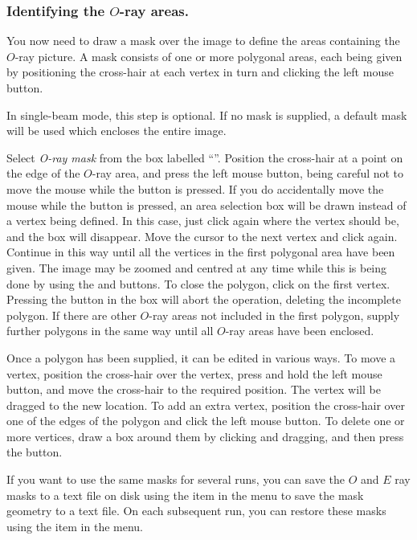 \subsubsection {Identifying the $O$-ray areas.}
You now need to draw a mask over the image to define the areas containing
the $O$-ray picture. A mask consists of one or more polygonal areas, each
being given by positioning the cross-hair at each vertex in turn and
clicking the left mouse button.

In single-beam mode, this step is optional. If no mask is supplied, a
default mask will be used which encloses the entire image.

Select {\em O-ray mask} from the box labelled ``''. Position the cross-hair at a point on the
edge of the $O$-ray area, and press the left mouse button, being careful
not to move the mouse while the button is pressed. If you do accidentally
move the mouse while the button is pressed, an area selection box will be
drawn instead of a vertex being defined. In this case, just click again
where the vertex should be, and the box will disappear. Move the cursor
to the next vertex and click again. Continue in this way until all the
vertices in the first polygonal area have been given. The image may be
zoomed and centred at any time while this is being done by using the
 and 
buttons. To close the polygon, click on the first vertex. Pressing the
 button in the  box will abort the operation,
deleting the incomplete polygon. If there are other $O$-ray areas not
included in the first polygon, supply further polygons in the same way
until all $O$-ray areas have been enclosed.

Once a polygon has been supplied, it can be edited in various ways. To
move a vertex, position the cross-hair over the vertex, press and hold
the left mouse button, and move the cross-hair to the required position.
The vertex will be dragged to the new location. To add an extra vertex,
position the cross-hair over one of the edges of the polygon and click
the left mouse button. To delete one or more vertices, draw a box around 
them by clicking and dragging, and then press the  button.

If you want to use the same masks for several runs, you can save the $O$
and $E$ ray masks to a text file on disk using the
 item in the
 menu to save the mask geometry to
a text file. On each subsequent run, you can restore these masks using the 
 item in the  
menu. 

